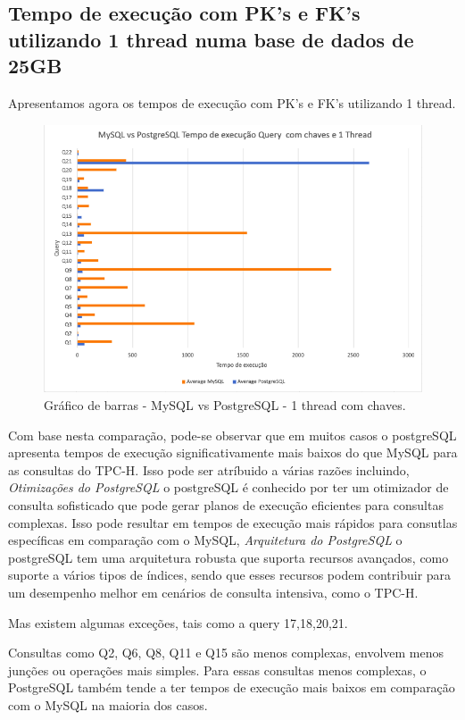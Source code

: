 \documentclass{article}
\begin{document}
\clearpage
\subsection{Tempo de execução com PK's e FK's utilizando 1 thread numa base
de dados de 25GB}
Apresentamos agora os tempos de execução com PK's e FK's utilizando 1 thread.
\begin{figure}[H]
  \centering
  \includegraphics[width=\textwidth]{Graphs/mysqlvspostgres_onethread.png}
  \caption{Gráfico de barras - MySQL vs PostgreSQL - 1 thread com chaves.}
  \label{fig:PKCreation2}
\end{figure}
\quad Com base nesta comparação, pode-se observar que em muitos casos o postgreSQL apresenta tempos de execução significativamente mais baixos do que MySQL para as consultas do TPC-H. Isso pode ser atríbuido a várias razões incluindo, \textit{Otimizações do PostgreSQL} o postgreSQL é conhecido por ter um otimizador de consulta sofisticado que pode gerar planos de execução eficientes para consultas complexas. Isso pode resultar em tempos de execução mais rápidos para consutlas específicas em comparação com o MySQL, \textit{Arquitetura do PostgreSQL} o postgreSQL tem uma arquitetura robusta que suporta recursos avançados, como suporte a vários tipos de índices, sendo que esses recursos podem contribuir para um desempenho melhor em cenários de consulta intensiva, como o TPC-H.

\quad Mas existem algumas exceções, tais como a query 17,18,20,21.

Consultas como Q2, Q6, Q8, Q11 e Q15 são menos complexas, envolvem menos junções ou operações mais simples.
Para essas consultas menos complexas, o PostgreSQL também tende a ter tempos de execução mais baixos em comparação com o MySQL na maioria dos casos.
\end{document}
